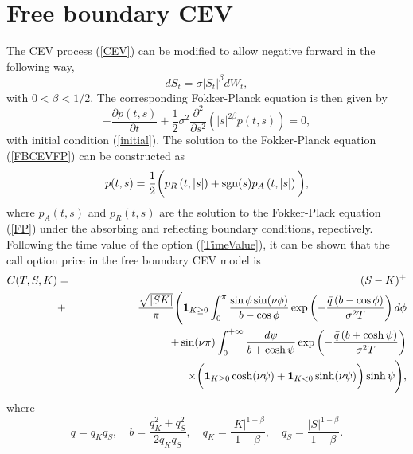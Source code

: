 \documentclass[12pt]{article}
\begin{document}
\section{Free boundary CEV}

  The CEV process (\ref{CEV}) can be modified to allow negative forward in the following way,
  \begin{equation}
    dS_t=\sigma \left|S_t\right|^{\beta}dW_t,
    \label{FreeBoundaryCEV}
  \end{equation}
  with $0<\beta<1/2$. The corresponding Fokker-Planck equation is then given by
  \begin{equation}
    -\frac{\partial p(t,s)}{\partial t}+\frac{1}{2}\sigma^2\frac{\partial^2}{\partial s^2}
    \left(\left|s\right|^{2\beta}p(t,s)\right) = 0,
    \label{FBCEVFP}
  \end{equation}
  with initial condition (\ref{initial}). The solution to the Fokker-Planck equation (\ref{FBCEVFP})
  can be constructed as
  \begin{equation}
    p(t,s)=\frac{1}{2}\bigg(p_R\left(t,\left|s\right|\right)+{\rm sgn}(s)p_A\left(t,\left|s\right|\right)\bigg),
  \end{equation}
  where $p_A(t,s)$ and $p_R(t,s)$ are the solution to the Fokker-Plack equation (\ref{FP}) under
  the absorbing and reflecting boundary conditions, repectively. Following the time value of the option (\ref{TimeValue}),
  it can be shown that the call option price in the free boundary CEV model is
  \begin{eqnarray}
    C(T,S,K) &=& (S-K)^+ \nonumber\\
             &+&\frac{\sqrt{\left|SK\right|}}{\pi}\Bigg({\bf 1}_{K\geq 0}\int_0^{\pi}\frac{\sin\phi\sin(\nu\phi)}{b-\cos\phi}
                        \exp\left(-\frac{\bar{q}\left(b-\cos\phi\right)}{\sigma^2T}\right)d\phi\nonumber\\
             &&\quad\quad\quad\quad\quad + \sin(\nu\pi)\int_0^{+\infty}
                \frac{d\psi}{b+\cosh \psi}
       \exp\left(-\frac{\bar{q}\left(b+\cosh \psi\right)}{\sigma^2T}\right)\nonumber\\
             &&\quad\quad\quad\quad\quad\quad\quad\quad\quad\quad \times
                  \bigg({\bf 1}_{K\geq 0}\cosh(\nu \psi)+{\bf 1}_{K< 0}\sinh(\nu \psi)\bigg)\sinh \psi\Bigg),
  \end{eqnarray}
  where
  \begin{equation}
    \bar{q}=q_Kq_S,\quad b=\frac{q_K^2+q_S^2}{2q_Kq_S},\quad q_K=\frac{|K|^{1-\beta}}{1-\beta},
    \quad q_S=\frac{|S|^{1-\beta}}{1-\beta}.
  \end{equation}
\end{document}
